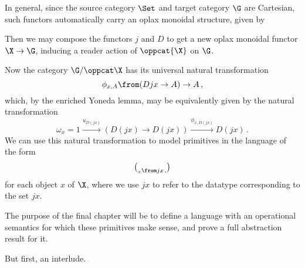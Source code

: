 In general, since the source category $\Set$ and target category $\G$ are Cartesian, such functors automatically carry an oplax monoidal structure, given by

Then we may compose the functors $j$ and $D$ to get a new oplax monoidal functor $\X \to \G$, inducing a reader action of $\oppcat{\X}$ on $\G$.

Now the category $\G/\oppcat\X$ has its universal natural transformation
\[
  \phi_{x,A} \from (Djx \to A) \to A\,,
  \]
which, by the enriched Yoneda lemma, may be equivalently given by the natural transformation
\[
  \omega_x = 1 \xrightarrow{u_{D(jx)}} (D(jx) \to D(jx)) \xrightarrow{\phi_{x,D(jx)}} D(jx)\,.
  \]
We can use this natural transformation to model primitives in the language of the form
\[
  \choose_x \from jx\,,
  \]
for each object $x$ of $\X$, where we use $jx$ to refer to the datatype corresponding to the set $jx$.

The purpose of the final chapter will be to define a language with an operational semantics for which these primitives make sense, and prove a full abstraction result for it.

But first, an interlude.
